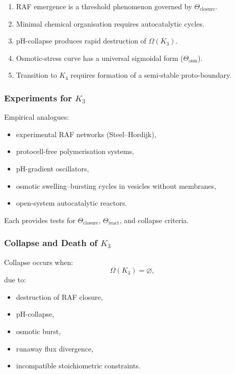 \begin{enumerate}
    \item RAF emergence is a threshold phenomenon governed by
          $\Theta_{\mathrm{closure}}$.
    \item Minimal chemical organisation requires autocatalytic cycles.
    \item pH-collapse produces rapid destruction of $\Omega(K_3)$.
    \item Osmotic-stress curve has a universal sigmoidal form 
          ($\Theta_{\mathrm{osm}}$).
    \item Transition to $K_4$ requires formation of a semi-stable
          proto-boundary.
\end{enumerate}

\subsubsection{Experiments for \texorpdfstring{$K_3$}{K_3}}

Empirical analogues:
\begin{itemize}
    \item experimental RAF networks (Steel–Hordijk),
    \item protocell-free polymerisation systems,
    \item pH-gradient oscillators,
    \item osmotic swelling–bursting cycles in vesicles without membranes,
    \item open-system autocatalytic reactors.
\end{itemize}

Each provides tests for $\Theta_{\mathrm{closure}}$,
$\Theta_{\mathrm{react}}$, and collapse criteria.

\subsubsection{Collapse and Death of \texorpdfstring{$K_3$}{K_3}}
\label{sec:k3-collapse}

Collapse occurs when:
\[
\Omega(K_3) = \varnothing,
\]
due to:
\begin{itemize}
    \item destruction of RAF closure,
    \item pH-collapse,
    \item osmotic burst,
    \item runaway flux divergence,
    \item incompatible stoichiometric constraints.
\end{itemize}

